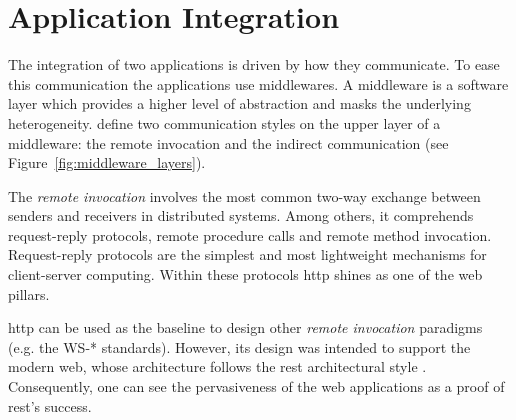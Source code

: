 \section{Application Integration}
\label{sec:soa_integration}

%
%


The integration of two applications is driven by how they communicate.
To ease this communication the applications use middlewares.
A middleware is a software layer which provides a higher level of abstraction and masks the underlying heterogeneity.
\citet{coulouris_distributed_2012} define two communication styles on the upper layer of a middleware: %
the remote invocation and the indirect communication (see Figure~\ref{fig:middleware_layers}).



\medskip

The \emph{remote invocation} involves the most common two-way exchange between senders and receivers in distributed systems.
Among others, it comprehends request-reply protocols, remote procedure calls and remote method invocation.
Request-reply protocols are the simplest and most lightweight mechanisms for client-server computing. %
Within these protocols \ac{http} shines as one of the web pillars.


\ac{http} can be used as the baseline to design other \emph{remote invocation} paradigms (e.g. the WS-* \citep{alonso_web_2010} standards).
However, its design was intended to support the modern web, whose architecture follows the \ac{rest} architectural style \citep{fielding_architectural_2000}.
Consequently, one can see the pervasiveness of the web applications as a proof of \ac{rest}'s success.

